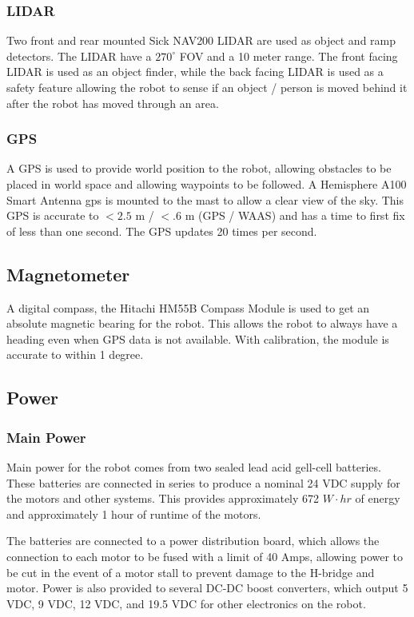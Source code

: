 \subsubsection{LIDAR}

Two front and rear mounted Sick NAV200 LIDAR are used as object and ramp detectors. The LIDAR have a $270^{\circ}$ FOV and a 10 meter range. The front facing LIDAR is used as an object finder, while the back facing LIDAR is used as a safety feature allowing the robot to sense if an object / person is moved behind it after the robot has moved through an area.

\subsubsection{GPS}

A GPS is used to provide world position to the robot, allowing obstacles to be placed in world space and allowing waypoints to be followed. A Hemisphere A100 Smart Antenna gps is mounted to the mast to allow a clear view of the sky. This GPS is accurate to $<2.5$ m / $<.6$ m (GPS / WAAS) and has a time to first fix of less than one second. The GPS updates 20 times per second.

\subsection{Magnetometer}

A digital compass, the Hitachi HM55B Compass Module is used to get an absolute magnetic bearing for the robot. This allows the robot to always have a heading even when GPS data is not available. With calibration, the module is accurate to within 1 degree. 


\subsection{Power}

\subsubsection{Main Power}

Main power for the robot comes from two sealed lead acid gell-cell batteries. These batteries are connected in series to produce a nominal 24 VDC supply for the motors and other systems. This provides approximately 672 $W \cdot hr$ of energy and approximately 1 hour of runtime of the motors.

The batteries are connected to a power distribution board, which allows the connection to each motor to be fused with a limit of 40 Amps, allowing power to be cut in the event of a motor stall to prevent damage to the H-bridge and motor. Power is also provided to several DC-DC boost converters, which output 5 VDC, 9 VDC, 12 VDC, and 19.5 VDC for other electronics on the robot.

